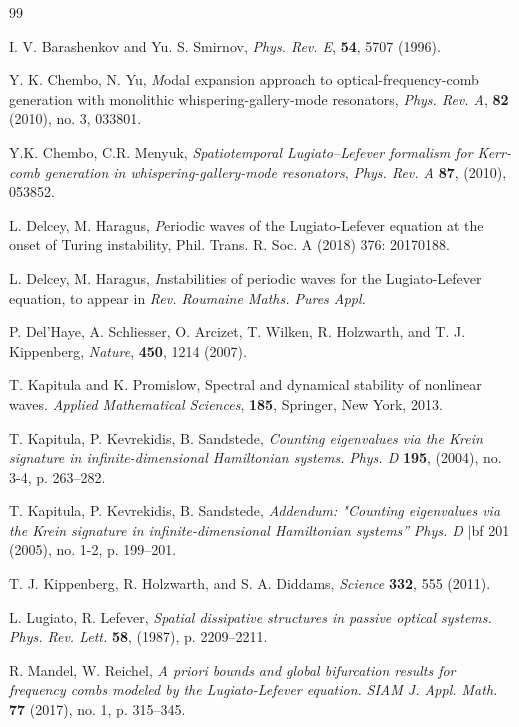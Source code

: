 \documentclass[12pt]{amsart}
\theoremstyle{definition}
\theoremstyle{remark}
\numberwithin{equation}{section}
\renewcommand{\(}{\left(}
\renewcommand{\)}{\right)}
\renewcommand{\[}{\left[}
\renewcommand{\]}{\right]}
\begin{document}
\begin{thebibliography}{99}
	
 	I. V. Barashenkov and Yu. S. Smirnov, {\em Phys. Rev. E}, {\bf 54}, 5707 (1996).
	
 	Y. K. Chembo, N. Yu, {\emph Modal expansion approach to optical-frequency-comb generation with monolithic whispering-gallery-mode resonators}, {\em Phys. Rev. A}, {\bf 82} (2010), no. 3, 033801.

 Y.K. Chembo, C.R. Menyuk, \emph{Spatiotemporal Lugiato–Lefever formalism for Kerr-comb generation in whispering-gallery-mode resonators},  {\em Phys. Rev. A} {\bf 87},  (2010), 053852.

  L. Delcey, M. Haragus, {\emph Periodic waves of the Lugiato-Lefever equation at the onset of Turing instability},  Phil. Trans. R. Soc. A (2018)  376:  20170188.

  L. Delcey, M. Haragus,  {\emph Instabilities of periodic waves for the Lugiato-Lefever equation}, to appear in  {\em Rev. Roumaine Maths. Pures Appl.}

  P. Del'Haye, A. Schliesser, O. Arcizet, T. Wilken, R. Holzwarth, and T. J. Kippenberg, {\em Nature},  {\bf 450}, 1214 (2007).

 T. Kapitula and K. Promislow,
Spectral and dynamical stability of nonlinear waves.  {\em Applied Mathematical Sciences}, {\bf  185},  Springer, New York, 2013.

 T. Kapitula, P. Kevrekidis, B. Sandstede, {\em Counting eigenvalues via the Krein signature in infinite-dimensional Hamiltonian systems.} {\em Phys. D} {\bf 195},  (2004), no. 3-4, p. 263--282.

 T. Kapitula, P. Kevrekidis, B. Sandstede, {\em Addendum: "Counting eigenvalues via the Krein signature in infinite-dimensional Hamiltonian systems''} {\em Phys. D} {|bf  201}  (2005), no. 1-2, p. 199--201.

 T. J. Kippenberg, R. Holzwarth, and S. A. Diddams, {\em Science} {\bf 332}, 555 (2011).

 L. Lugiato, R. Lefever,  \emph{Spatial dissipative structures in passive optical systems.} {\em Phys. Rev. Lett.}  {\bf 58}, (1987), p. 2209--2211.


 R. Mandel,  W. Reichel, \emph{A priori bounds and global bifurcation results for frequency combs modeled by the Lugiato-Lefever equation.} {\em
SIAM J. Appl. Math.} {\bf  77}  (2017), no. 1,  p. 315--345.


\end{thebibliography}
\end{document}
